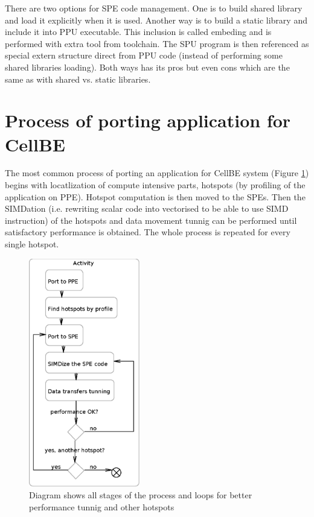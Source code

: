 \par
There are two options for SPE code management. One is to build shared library
and load it explicitly when it is used. Another way is to build a static library
and include it into PPU executable. This inclusion is called embeding and is
performed with extra tool from toolchain. The SPU program is then referenced as
special extern structure direct from PPU code (instead of performing some shared
libraries loading). Both ways has its pros but even cons which are the same as
with shared vs. static libraries.


\section {Process of porting application for CellBE}

\par
The most common process of porting an application for CellBE system (Figure \ref{fg:appPorting}) begins with locatlization of compute intensive parts, hotspots (by profiling of the application on PPE). Hotspot computation is then moved to the SPEs. Then the SIMDation (i.e. rewriting scalar code into vectorised to be able to use SIMD instruction) of the hotspots and data movement tunnig can be performed until satisfactory performance is obtained. The whole process is repeated for every single hotspot.

\begin{figure}
    \centering
    \includegraphics[height=10cm]{data/portingCycle.eps}
    \caption[Application for CellBE porting process]{Diagram shows all stages of the process and loops for better performance tunnig and other hotspots}
    \label{fg:appPorting}
\end{figure}